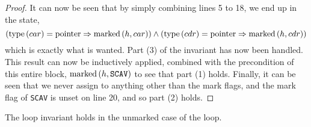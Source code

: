 \begin{proof}
  It can now be seen that by simply combining lines 5 to 18, we end up
  in the state, \[(\mathrm{type}\left(car\right) = \mathrm{pointer} \Rightarrow \mathrm{marked}\left(h, car\right))
  \land (\mathrm{type}\left(cdr\right) = \mathrm{pointer} \Rightarrow \mathrm{marked}\left(h, cdr\right))\] which is
  exactly what is wanted. Part (3) of the invariant has now been
  handled. This result can now be inductively applied, combined with
  the precondition of this entire block, $\mathrm{marked}\left(h, \mathtt{SCAV}\right)$
  to see that part (1) holds. Finally, it can be seen that we never
  assign to anything other than the mark flags, and the mark flag of
  \texttt{SCAV} is unset on line 20, and so part (2) holds.
\end{proof}

\begin{lemma}
  \label{lem:lib}
  The loop invariant holds in the unmarked case of the loop.
\end{lemma}


